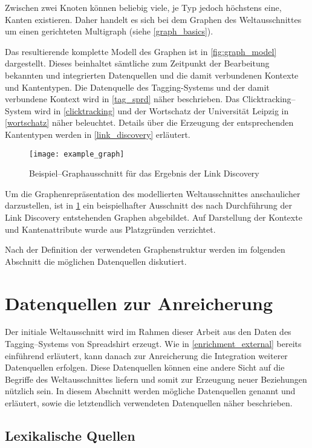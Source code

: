 Zwischen zwei Knoten können beliebig viele, je Typ jedoch höchstens eine, Kanten existieren. Daher handelt es sich bei dem Graphen des Weltausschnittes um einen gerichteten Multigraph (siehe \cref{graph_basics}).

Das resultierende komplette Modell des Graphen ist in \cref{fig:graph_model} dargestellt. Dieses beinhaltet sämtliche zum Zeitpunkt der Bearbeitung bekannten und integrierten Datenquellen und die damit verbundenen Kontexte und Kantentypen. Die Datenquelle des Tagging-Systems und der damit verbundene Kontext wird in \cref{tag_sprd} näher beschrieben. Das Clicktracking--System wird in \cref{clicktracking} und der Wortschatz der Universität Leipzig in \cref{wortschatz} näher beleuchtet. Details über die Erzeugung der entsprechenden Kantentypen werden in \cref{link_discovery} erläutert.

\begin{figure}[t]
\centering
\texttt{[image: example\_graph]}
\caption{Beispiel--Graphausschnitt für das Ergebnis der Link Discovery}
\label{fig:example_graph}
\end{figure}

Um die Graphenrepräsentation des modellierten Weltausschnittes anschaulicher darzustellen, ist in \cref{fig:example_graph} ein beispielhafter Ausschnitt des nach Durchführung der Link Discovery entstehenden Graphen abgebildet. Auf Darstellung der Kontexte und Kantenattribute wurde aus Platzgründen verzichtet.

Nach der Definition der verwendeten Graphenstruktur werden im folgenden Abschnitt die möglichen Datenquellen diskutiert.

\section{Datenquellen zur Anreicherung}

Der initiale Weltausschnitt wird im Rahmen dieser Arbeit aus den Daten des Tagging--Systems von Spreadshirt erzeugt. Wie in \cref{enrichment_external} bereits einführend erläutert, kann danach zur Anreicherung die Integration weiterer Datenquellen erfolgen. Diese Datenquellen können eine andere Sicht auf die Begriffe des Weltausschnittes liefern und somit zur Erzeugung neuer Beziehungen nützlich sein. In diesem Abschnitt werden mögliche Datenquellen genannt und erläutert, sowie die letztendlich verwendeten Datenquellen näher beschrieben.

\subsection{Lexikalische Quellen}

